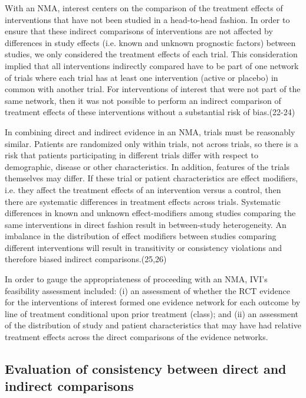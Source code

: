 \documentclass[11pt,final,fleqn]{article}\usepackage[]{graphicx}\usepackage[]{color}
\theoremstyle{plain}
\begin{document}
{\begin{appendices}
With an NMA, interest centers on the comparison of the treatment effects of interventions that have not been studied in a head-to-head fashion. In order to ensure that these indirect comparisons of interventions are not affected by differences in study effects (i.e. known and unknown prognostic factors) between studies, we only considered the treatment effects of each trial. This consideration implied that all interventions indirectly compared have to be part of one network of trials where each trial has at least one intervention (active or placebo) in common with another trial. For interventions of interest that were not part of the same network, then it was not possible to perform an indirect comparison of treatment effects of these interventions without a substantial risk of bias.(22-24)

In combining direct and indirect evidence in an NMA, trials must be reasonably similar. Patients are randomized only within trials, not across trials, so there is a risk that patients participating in different trials differ with respect to demographic, disease or other characteristics. In addition, features of the trials themselves may differ. If these trial or patient characteristics are effect modifiers, i.e. they affect the treatment effects of an intervention versus a control, then there are systematic differences in treatment effects across trials. Systematic differences in known and unknown effect-modifiers among studies comparing the same interventions in direct fashion result in between-study heterogeneity. An imbalance in the distribution of effect modifiers between studies comparing different interventions will result in transitivity or consistency violations and therefore biased indirect comparisons.(25,26) 

In order to gauge the appropriateness of proceeding with an NMA, IVI's feasibility assessment included: (i) an assessment of whether the RCT evidence for the interventions of interest formed one evidence network for each outcome by line of treatment conditional upon prior treatment (class); and (ii) an assessment of the distribution of study and patient characteristics that may have had relative treatment effects across the direct comparisons of the evidence networks.

\subsection{Evaluation of consistency between direct and indirect comparisons}


\end{appendices}}
\end{document}
